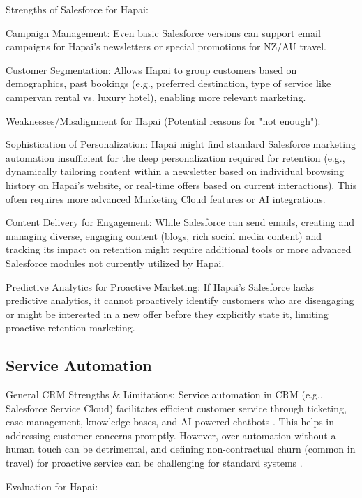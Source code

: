 \documentclass{article}
\begin{document}
Strengths of Salesforce for Hapai:

Campaign Management: Even basic Salesforce versions can support email campaigns for Hapai's newsletters or special promotions for NZ/AU travel.

Customer Segmentation: Allows Hapai to group customers based on demographics, past bookings (e.g., preferred destination, type of service like campervan rental vs. luxury hotel), enabling more relevant marketing.

Weaknesses/Misalignment for Hapai (Potential reasons for "not enough"):

Sophistication of Personalization: Hapai might find standard Salesforce marketing automation insufficient for the deep personalization required for retention (e.g., dynamically tailoring content within a newsletter based on individual browsing history on Hapai’s website, or real-time offers based on current interactions). This often requires more advanced Marketing Cloud features or AI integrations.

Content Delivery for Engagement: While Salesforce can send emails, creating and managing diverse, engaging content (blogs, rich social media content) and tracking its impact on retention might require additional tools or more advanced Salesforce modules not currently utilized by Hapai.

Predictive Analytics for Proactive Marketing: If Hapai’s Salesforce lacks predictive analytics, it cannot proactively identify customers who are disengaging or might be interested in a new offer before they explicitly state it, limiting proactive retention marketing.

\subsection{Service Automation}

General CRM Strengths \& Limitations:
Service automation in CRM (e.g., Salesforce Service Cloud) facilitates efficient customer service through ticketing, case management, knowledge bases, and AI-powered chatbots \cite{ayub_artificial_2025,commerce_shri_v_r_patel_college_of_commerce_mehsana_impact_2024}. This helps in addressing customer concerns promptly. However, over-automation without a human touch can be detrimental, and defining non-contractual churn (common in travel) for proactive service can be challenging for standard systems \cite{ayub_artificial_2025,viljoen_customer_2016}.

Evaluation for Hapai:
\end{document}
